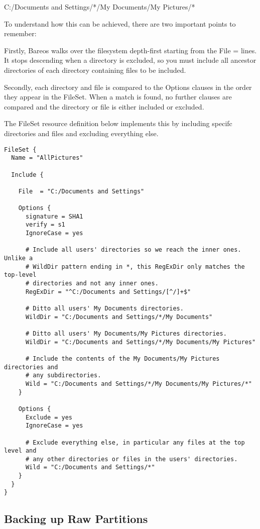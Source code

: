 C:/Documents and Settings/*/My Documents/My Pictures/*

To understand how this can be achieved, there are two important points to
remember:

Firstly, Bareos walks over the filesystem depth-first starting from the File =
lines.  It stops descending when a directory is excluded, so you must include
all ancestor directories of each directory containing files to be included.

Secondly, each directory and file is compared to the Options clauses in the
order they appear in the FileSet.  When a match is found, no further clauses
are compared and the directory or file is either included or excluded.

The FileSet resource definition below implements this by including specifc
directories and files and excluding everything else.

\footnotesize
\begin{verbatim}
FileSet {
  Name = "AllPictures"

  Include {

    File  = "C:/Documents and Settings"

    Options {
      signature = SHA1
      verify = s1
      IgnoreCase = yes

      # Include all users' directories so we reach the inner ones.  Unlike a
      # WildDir pattern ending in *, this RegExDir only matches the top-level
      # directories and not any inner ones.
      RegExDir = "^C:/Documents and Settings/[^/]+$"

      # Ditto all users' My Documents directories.
      WildDir = "C:/Documents and Settings/*/My Documents"

      # Ditto all users' My Documents/My Pictures directories.
      WildDir = "C:/Documents and Settings/*/My Documents/My Pictures"

      # Include the contents of the My Documents/My Pictures directories and
      # any subdirectories.
      Wild = "C:/Documents and Settings/*/My Documents/My Pictures/*"
    }

    Options {
      Exclude = yes
      IgnoreCase = yes

      # Exclude everything else, in particular any files at the top level and
      # any other directories or files in the users' directories.
      Wild = "C:/Documents and Settings/*"
    }
  }
}
\end{verbatim}
\normalsize

\subsection{Backing up Raw Partitions}

